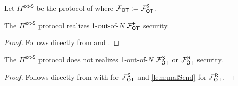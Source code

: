 \begin{definition}\label{def:ext_S_U}
	Let $\Pi^{\textsf{ext-S}}$ be the protocol of  where $\mathcal{F}_{\mathsf{OT}}:=\mathcal{F}_{\mathsf{OT}}^\mathsf{S}$.
\end{definition}
\begin{lemma}
	The $\Pi^\textsf{ext-S}$ protocol realizes 1-out-of-$N$ $\mathcal{F}_{\mathsf{OT}}^\mathsf{E}$ security.
\end{lemma}
\begin{proof}
	Follows directly from  and .
\end{proof}
\begin{lemma}
		The $\Pi^\textsf{ext-S}$ protocol does not realizes 1-out-of-$N$ $\mathcal{F}_{\mathsf{OT}}^\mathsf{S}$ or $\mathcal{F}_{\mathsf{OT}}^\mathsf{R}$ security.
\end{lemma}
\begin{proof}
	Follows directly from  with  for $\mathcal{F}_{\mathsf{OT}}^\mathsf{S}$ and \ref{lem:malSend} for $\mathcal{F}_{\mathsf{OT}}^\mathsf{R}$.
\end{proof}
\fi



